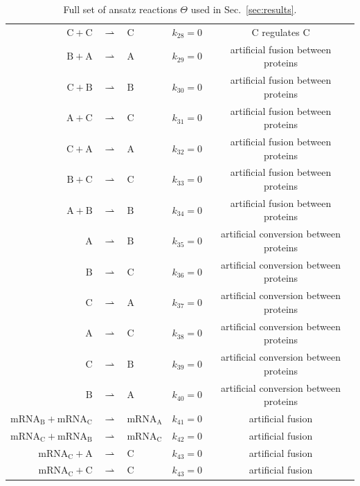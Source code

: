 \documentclass[oneside, abstracton, titlepage]{scrartcl}
\begin{document}
\begin{table}[h]
{\begin{tabular}{rclcc}
				$\mathrm{C} + \mathrm{C}$ &$\rightharpoonup$& $\mathrm{C}$ & $k_{28} = 0$ & $\mathrm{C}$ regulates $\mathrm{C}$\\
				$\mathrm{B} + \mathrm{A}$ &$\rightharpoonup$& $\mathrm{A}$ & $k_{29} = 0$ & artificial fusion between proteins\\
				$\mathrm{C} + \mathrm{B}$ &$\rightharpoonup$& $\mathrm{B}$ & $k_{30} = 0$ & artificial fusion between proteins\\
				$\mathrm{A} + \mathrm{C}$ &$\rightharpoonup$& $\mathrm{C}$ & $k_{31} = 0$ & artificial fusion between proteins\\
				$\mathrm{C} + \mathrm{A}$ &$\rightharpoonup$& $\mathrm{A}$ & $k_{32} = 0$ & artificial fusion between proteins\\
				$\mathrm{B} + \mathrm{C}$ &$\rightharpoonup$& $\mathrm{C}$ & $k_{33} = 0$ & artificial fusion between proteins\\
				$\mathrm{A} + \mathrm{B}$ &$\rightharpoonup$& $\mathrm{B}$ & $k_{34} = 0$ & artificial fusion between proteins\\
				$\mathrm{A}$ &$\rightharpoonup$& $\mathrm{B}$ & $k_{35} = 0$ & artificial conversion between proteins\\
				$\mathrm{B}$ &$\rightharpoonup$& $\mathrm{C}$ & $k_{36} = 0$ & artificial conversion between proteins\\
				$\mathrm{C}$ &$\rightharpoonup$& $\mathrm{A}$ & $k_{37} = 0$ & artificial conversion between proteins\\
				$\mathrm{A}$ &$\rightharpoonup$& $\mathrm{C}$ & $k_{38} = 0$ & artificial conversion between proteins\\
				$\mathrm{C}$ &$\rightharpoonup$& $\mathrm{B}$ & $k_{39} = 0$ & artificial conversion between proteins\\
				$\mathrm{B}$ &$\rightharpoonup$& $\mathrm{A}$ & $k_{40} = 0$ & artificial conversion between proteins\\
				$\mathrm{mRNA}_\mathrm{B} + \mathrm{mRNA}_\mathrm{C}$ &$\rightharpoonup$& $\mathrm{mRNA}_\mathrm{A}$ & $k_{41} = 0$ & artificial fusion\\
				$\mathrm{mRNA}_\mathrm{C} + \mathrm{mRNA}_\mathrm{B}$ &$\rightharpoonup$& $\mathrm{mRNA}_\mathrm{C}$ & $k_{42} = 0$ & artificial fusion\\
				$\mathrm{mRNA}_\mathrm{C} + \mathrm{A}$ &$\rightharpoonup$& $\mathrm{C}$ & $k_{43} = 0$ & artificial fusion\\
				$\mathrm{mRNA}_\mathrm{C} + \mathrm{C}$ &$\rightharpoonup$& $\mathrm{C}$ & $k_{43} = 0$ & artificial fusion
			\end{tabular}
		}
		\caption{Full set of ansatz reactions $\Theta$ used in Sec.~\ref{sec:results}.}
		\label{tab:reaction-library}
	\end{table}
\end{document}
